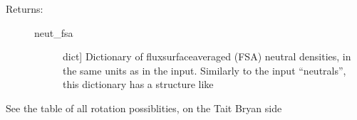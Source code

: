 \documentclass[letterpaper,10pt,english]{sphinxmanual}
\begin{document}
\begin{fulllineitems}
\begin{description}
\item[{Returns:}] \leavevmode\begin{description}
\item[{neut\_fsa}] \leavevmode{[}dict{]}
Dictionary of flux\sphinxhyphen{}surface\sphinxhyphen{}averaged (FSA) neutral densities, in the same units as in the input. 
Similarly to the input “neutrals”, this dictionary has a structure like

\begin{sphinxVerbatim}[commandchars=\\\{\}]
\PYG{p}{[}\PYG{p}{]}\PYG{p}{[}\PYG{p}{]}\PYG{p}{[}\PYG{p}{]}
\end{sphinxVerbatim}

\end{description}

\end{description}

\end{fulllineitems}


\begin{fulllineitems}
\label{\detokenize{aurora:aurora.nbi_neutrals.rotation_matrix}}
See the table of all rotation possiblities, on the Tait Bryan side

\end{fulllineitems}

\end{document}
